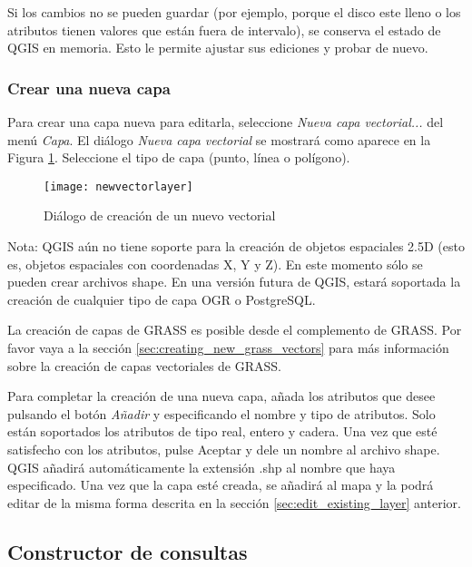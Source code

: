Si los cambios no se pueden guardar (por ejemplo, porque el disco este lleno o los atributos tienen valores que están fuera de intervalo), se conserva el estado de QGIS en memoria. Esto le permite ajustar sus ediciones y probar de nuevo.

\subsubsection{Crear una nueva capa}\label{sec:create shape}

Para crear una capa nueva para editarla, seleccione \textit{Nueva capa vectorial...} del menú \textit{Capa}. El diálogo \textit{Nueva capa vectorial} se mostrará como aparece en la Figura \ref{fig:newvectorlayer}. Seleccione el tipo de capa (punto, línea o polígono).

\begin{figure}[ht]
   \begin{center}
   \caption{Diálogo de creación de un nuevo vectorial}\label{fig:newvectorlayer}\smallskip
   \texttt{[image: newvectorlayer]}
\end{center} 
\end{figure}

Nota: QGIS aún no tiene soporte para la creación de objetos espaciales 2.5D (esto es, objetos espaciales con coordenadas X, Y y Z). En este momento sólo se pueden crear archivos shape. En una versión futura de QGIS, estará soportada la creación de cualquier tipo de capa OGR o PostgreSQL. 

La creación de capas de GRASS es posible desde el complemento de GRASS. Por favor vaya a la sección \ref{sec:creating_new_grass_vectors} para más información sobre la creación de capas vectoriales de GRASS.

Para completar la creación de una nueva capa, añada los atributos que desee pulsando el botón \textit{Añadir} y especificando el nombre y tipo de atributos. Solo están soportados los atributos de tipo real, entero y cadera. Una vez que esté satisfecho con los atributos, pulse Aceptar y dele un nombre al archivo shape. QGIS añadirá automáticamente la extensión .shp al nombre que haya especificado. Una vez que la capa esté creada, se añadirá al mapa y la podrá editar de la misma forma descrita en la sección \ref{sec:edit_existing_layer} anterior.

\subsection{Constructor de consultas}\label{sec:query_builder}

